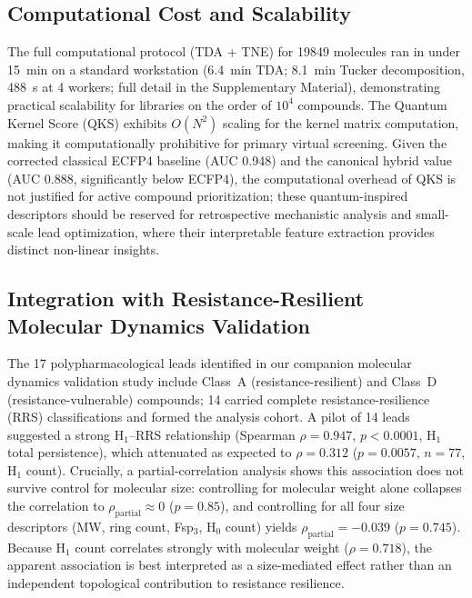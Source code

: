 \documentclass[11pt,a4paper]{article}
\begin{document}
\subsection{Computational Cost and Scalability}

The full computational protocol (TDA + TNE) for \num{19849} molecules ran in under \SI{15}{\minute} on a standard workstation (\SI{6.4}{\minute} TDA; \SI{8.1}{\minute} Tucker decomposition, \SI{488}{\second} at 4 workers; full detail in the Supplementary Material), demonstrating practical scalability for libraries on the order of $10^4$ compounds. The Quantum Kernel Score (QKS) exhibits $O(N^2)$ scaling for the kernel matrix computation, making it computationally prohibitive for primary virtual screening. Given the corrected classical ECFP4 baseline (AUC \num{0.948}) and the canonical hybrid value (AUC \num{0.888}, significantly below ECFP4), the computational overhead of QKS is not justified for active compound prioritization; these quantum-inspired descriptors should be reserved for retrospective mechanistic analysis and small-scale lead optimization, where their interpretable feature extraction provides distinct non-linear insights.

\subsection{Integration with Resistance-Resilient Molecular Dynamics Validation}

The 17 polypharmacological leads identified in our companion molecular dynamics validation study \citep{temgoua2027md} include Class~A (resistance-resilient) and Class~D (resistance-vulnerable) compounds; 14 carried complete resistance-resilience (RRS) classifications and formed the analysis cohort. A pilot of 14 leads suggested a strong H$_1$--RRS relationship (Spearman $\rho = 0.947$, $p < 0.0001$, H$_1$ total persistence), which attenuated as expected to $\rho = 0.312$ ($p = 0.0057$, $n = 77$, H$_1$ count). Crucially, a partial-correlation analysis shows this association does not survive control for molecular size: controlling for molecular weight alone collapses the correlation to $\rho_{\text{partial}} \approx 0$ ($p = 0.85$), and controlling for all four size descriptors (MW, ring count, Fsp$_3$, H$_0$ count) yields $\rho_{\text{partial}} = -0.039$ ($p = 0.745$). Because H$_1$ count correlates strongly with molecular weight ($\rho = 0.718$), the apparent association is best interpreted as a size-mediated effect rather than an independent topological contribution to resistance resilience.
\end{document}
